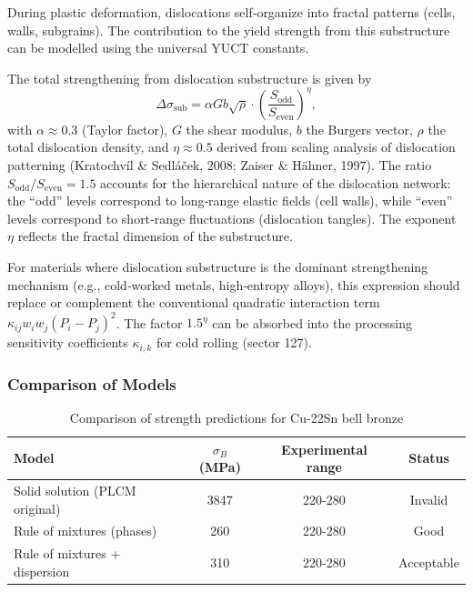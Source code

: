 \documentclass[12pt,a4paper]{article}
\begin{document}
	During plastic deformation, dislocations self‑organize into fractal patterns (cells, walls, subgrains). The contribution to the yield strength from this substructure can be modelled using the universal YUCT constants.
	
	The total strengthening from dislocation substructure is given by
	\[
	\Delta\sigma_{\text{sub}} = \alpha G b \sqrt{\rho} \cdot \left( \frac{S_{\text{odd}}}{S_{\text{even}}} \right)^{\eta},
	\]
	with \(\alpha \approx 0.3\) (Taylor factor), \(G\) the shear modulus, \(b\) the Burgers vector, \(\rho\) the total dislocation density, and \(\eta \approx 0.5\) derived from scaling analysis of dislocation patterning (Kratochv\'il \& Sedl\'a\v{c}ek, 2008; Zaiser \& H\"ahner, 1997). The ratio \(S_{\text{odd}}/S_{\text{even}}=1.5\) accounts for the hierarchical nature of the dislocation network: the “odd” levels correspond to long‑range elastic fields (cell walls), while “even” levels correspond to short‑range fluctuations (dislocation tangles). The exponent \(\eta\) reflects the fractal dimension of the substructure.
	
	For materials where dislocation substructure is the dominant strengthening mechanism (e.g., cold‑worked metals, high‑entropy alloys), this expression should replace or complement the conventional quadratic interaction term \(\kappa_{ij} w_i w_j (P_i-P_j)^2\). The factor \(1.5^{\eta}\) can be absorbed into the processing sensitivity coefficients \(\kappa_{i,k}\) for cold rolling (sector 127).
	
	\subsubsection{Comparison of Models}
	
	\begin{table}[htbp]
		\centering
		\caption{Comparison of strength predictions for Cu-22Sn bell bronze}
		\label{tab:cu-sn-comparison}
		\begin{tabular}{lccc}
			\toprule
			\textbf{Model} & \(\sigma_B\) (MPa) & \textbf{Experimental range} & \textbf{Status} \\
			\midrule
			Solid solution (PLCM original) & 3847 & 220-280 & Invalid \\
			Rule of mixtures (phases) & 260 & 220-280 & Good \\
			Rule of mixtures + dispersion & 310 & 220-280 & Acceptable \\
			\bottomrule
		\end{tabular}
	\end{table}
	
\end{document}
